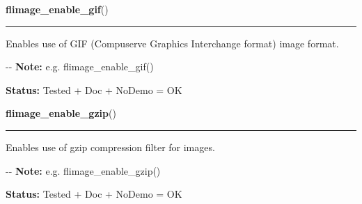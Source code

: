     \label{xformslib:flflimage:flimage_enable_gif}

    \vspace{0.5ex}

\hspace{.8\funcindent}\begin{boxedminipage}{\funcwidth}

    \raggedright \textbf{flimage\_enable\_gif}()

    \vspace{-1.5ex}

    \rule{\textwidth}{0.5\fboxrule}
\setlength{\parskip}{2ex}

Enables use of GIF (Compuserve Graphics Interchange format) image
format.

-{}-
\setlength{\parskip}{1ex}
\textbf{Note:} 
e.g. flimage\_enable\_gif()


\textbf{Status:} 
Tested + Doc + NoDemo = OK


    \end{boxedminipage}

    \label{xformslib:flflimage:flimage_enable_gzip}

    \vspace{0.5ex}

\hspace{.8\funcindent}\begin{boxedminipage}{\funcwidth}

    \raggedright \textbf{flimage\_enable\_gzip}()

    \vspace{-1.5ex}

    \rule{\textwidth}{0.5\fboxrule}
\setlength{\parskip}{2ex}

Enables use of gzip compression filter for images.

-{}-
\setlength{\parskip}{1ex}
\textbf{Note:} 
e.g. flimage\_enable\_gzip()


\textbf{Status:} 
Tested + Doc + NoDemo = OK


    \end{boxedminipage}

    \label{xformslib:flflimage:flimage_enable_jpeg}

